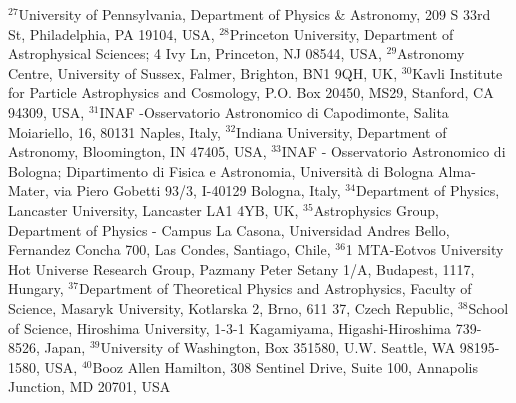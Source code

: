 {$^{27}$University of Pennsylvania, Department of Physics \& Astronomy, 209 S 33rd St, Philadelphia, PA 19104, USA,
$^{28}$Princeton University, Department of Astrophysical Sciences; 4 Ivy Ln, Princeton, NJ 08544, USA,
$^{29}$Astronomy Centre, University of Sussex, Falmer, Brighton, BN1 9QH, UK,
$^{30}$Kavli Institute for Particle Astrophysics and Cosmology, P.O. Box 20450, MS29, Stanford, CA 94309, USA,
$^{31}$INAF -Osservatorio Astronomico di Capodimonte, Salita Moiariello, 16, 80131 Naples, Italy, 
$^{32}$Indiana University, Department of Astronomy, Bloomington, IN 47405, USA,
$^{33}$INAF - Osservatorio Astronomico di Bologna; Dipartimento di Fisica e Astronomia, Universit\`a di Bologna Alma-Mater, via Piero Gobetti 93/3, I-40129 Bologna, Italy,
$^{34}$Department of Physics, Lancaster University, Lancaster LA1 4YB, UK,
$^{35}$Astrophysics Group, Department of Physics - Campus La Casona, Universidad Andres Bello, Fernandez Concha 700, Las Condes,  Santiago, Chile,
$^{36}$1 MTA-Eotvos University Hot Universe Research Group, Pazmany Peter Setany 1/A, Budapest, 1117, Hungary,
$^{37}$Department of Theoretical Physics and Astrophysics, Faculty of Science, Masaryk University, Kotlarska 2, Brno, 611 37, Czech Republic,
$^{38}$School of Science, Hiroshima University, 1-3-1 Kagamiyama, Higashi-Hiroshima 739-8526, Japan,
$^{39}$University of Washington, Box 351580, U.W. Seattle, WA 98195-1580, USA,
$^{40}$Booz Allen Hamilton, 308 Sentinel Drive, Suite 100, Annapolis Junction, MD 20701, USA







}
